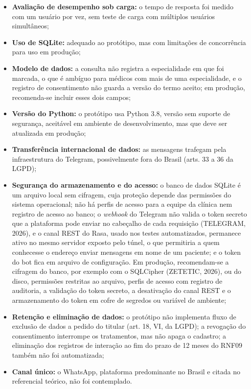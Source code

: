 \documentclass[12pt,a4paper]{extarticle}
\begin{document}
\begin{itemize}
    \item \textbf{Avaliação de desempenho sob carga:} o tempo de resposta foi medido com um usuário por vez, sem teste de carga com múltiplos usuários simultâneos;
    \item \textbf{Uso de SQLite:} adequado ao protótipo, mas com limitações de concorrência para uso em produção;
    \item \textbf{Modelo de dados:} a consulta não registra a especialidade em que foi marcada, o que é ambíguo para médicos com mais de uma especialidade, e o registro de consentimento não guarda a versão do termo aceito; em produção, recomenda-se incluir esses dois campos;
    \item \textbf{Versão do Python:} o protótipo usa Python 3.8, versão sem suporte de segurança, aceitável em ambiente de desenvolvimento, mas que deve ser atualizada em produção;
    \item \textbf{Transferência internacional de dados:} as mensagens trafegam pela infraestrutura do Telegram, possivelmente fora do Brasil (arts. 33 a 36 da LGPD);
    \item \textbf{Segurança do armazenamento e do acesso:} o banco de dados SQLite é um arquivo local sem cifragem, cuja proteção depende das permissões do sistema operacional; não há perfis de acesso para a equipe da clínica nem registro de acesso ao banco; o \textit{webhook} do Telegram não valida o token secreto que a plataforma pode enviar no cabeçalho de cada requisição (TELEGRAM, 2026), e o canal REST do Rasa, usado nos testes automatizados, permanece ativo no mesmo servidor exposto pelo túnel, o que permitiria a quem conhecesse o endereço enviar mensagens em nome de um paciente; e o token do bot fica em arquivo de configuração. Em produção, recomendam-se a cifragem do banco, por exemplo com o SQLCipher (ZETETIC, 2026), ou do disco, permissões restritas ao arquivo, perfis de acesso com registro de auditoria, a validação do token secreto, a desativação do canal REST e o armazenamento do token em cofre de segredos ou variável de ambiente;
    \item \textbf{Retenção e eliminação de dados:} o protótipo não implementa fluxo de exclusão de dados a pedido do titular (art. 18, VI, da LGPD); a revogação do consentimento interrompe os tratamentos, mas não apaga o cadastro; a eliminação dos registros de interação ao fim do prazo de 12 meses do RNF09 também não foi automatizada;
    \item \textbf{Canal único:} o WhatsApp, plataforma predominante no Brasil e citada no referencial teórico, não foi contemplado.
\end{itemize}
\end{document}
